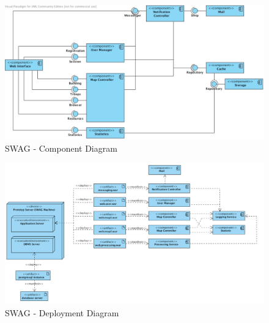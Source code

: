 \documentclass[11pt]{article}
\begin{document}
\begin{figure}[h]
\center
\includegraphics[scale=0.5]{diagrams/SWAG_Component_Diagram.pdf}
\caption{SWAG - Component Diagram}
\label{fig:component}
\end{figure}

\begin{figure}[h]
\hspace{-2cm}
\includegraphics[scale=0.55]{diagrams/SWAG_Deployment_Diagram.pdf}
\caption{SWAG - Deployment Diagram}
\label{fig:deployment}
\end{figure}

 
\end{document}
